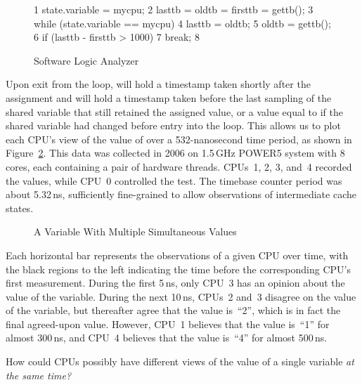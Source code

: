 \begin{figure}[htbp]
{ \scriptsize
\begin{verbbox}
  1 state.variable = mycpu;
  2 lasttb = oldtb = firsttb = gettb();
  3 while (state.variable == mycpu) {
  4   lasttb = oldtb;
  5   oldtb = gettb();
  6   if (lasttb - firsttb > 1000)
  7     break;
  8 }
\end{verbbox}
}
\centering
\theverbbox
\caption{Software Logic Analyzer}
\label{fig:advsync:Software Logic Analyzer}
\end{figure}

Upon exit from the loop,  will hold a timestamp
taken shortly after the assignment and  will hold
a timestamp taken before the last sampling of the shared variable
that still retained the assigned value, or a value equal to 
if the shared variable had changed before entry into the loop.
This allows us to plot each CPU's view of the value of 
over a 532-nanosecond time period, as shown in
Figure~\ref{fig:advsync:A Variable With Multiple Simultaneous Values}.
This data was collected in 2006 on 1.5\,GHz POWER5 system with 8 cores,
each containing a pair of hardware threads.
CPUs~1, 2, 3, and~4 recorded the values, while CPU~0 controlled the test.
The timebase counter period was about 5.32\,ns, sufficiently fine-grained
to allow observations of intermediate cache states.

\begin{figure}[htb]
\centering
{}
\caption{A Variable With Multiple Simultaneous Values}
\label{fig:advsync:A Variable With Multiple Simultaneous Values}
\end{figure}

Each horizontal bar represents the observations of a given CPU over time,
with the black regions to the left indicating the time before the
corresponding CPU's first measurement.
During the first 5\,ns, only CPU~3 has an opinion about the value of the
variable.
During the next 10\,ns, CPUs~2 and~3 disagree on the value of the variable,
but thereafter agree that the value is~``2'', which is in fact
the final agreed-upon value.
However, CPU~1 believes that the value is~``1'' for almost 300\,ns, and
CPU~4 believes that the value is~``4'' for almost 500\,ns.

\QuickQuiz{}
	How could CPUs possibly have different views of the
	value of a single variable \emph{at the same time?}
 \QuickQuizEnd

